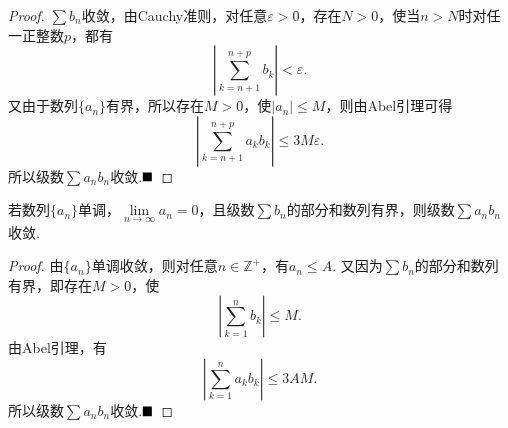 \begin{proof}
	$\sum b_n$收敛，由Cauchy准则，对任意$\varepsilon>0$，存在$N>0$，使当$n>N$时对任一正整数$p$，都有
	$$\left|\sum_{k=n+1}^{n+p}b_k\right|<\varepsilon.$$
	又由于数列$\{a_n\}$有界，所以存在$M>0$，使$|a_n|\leqslant M$，则由Abel引理可得
	$$\left|\sum_{k=n+1}^{n+p}a_kb_k\right|\leqslant 3M\varepsilon.$$
	所以级数$\sum a_nb_n$收敛.$\hfill\blacksquare$
\end{proof}
\begin{theorem}[Dirichlet判别法]
	若数列$\{a_n\}$单调，$\lim\limits_{n\to\infty}a_n=0$，且级数$\sum b_n$的部分和数列有界，则级数$\sum a_nb_n$收敛.
\end{theorem}
\begin{proof}
	由$\{a_n\}$单调收敛，则对任意$n\in\mathbb{Z}^+$，有$a_n\leqslant A$. 又因为$\sum b_n$的部分和数列有界，即存在$M>0$，使
	$$\left|\sum_{k=1}^{n}b_k\right|\leqslant M.$$
	由Abel引理，有
	$$\left|\sum_{k=1}^{n}a_kb_k\right|\leqslant 3AM.$$
	所以级数$\sum a_nb_n$收敛.$\hfill\blacksquare$
\end{proof}